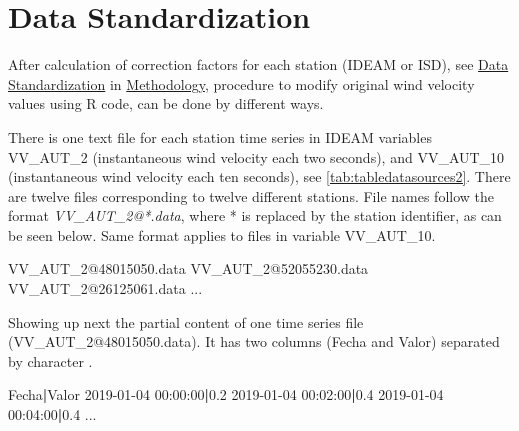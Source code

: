 \documentclass[12pt,oneside]{reedthesis}
\newenvironment{Shaded}{\begin{snugshade}}{\end{snugshade}}
\newcommand{\ExtensionTok}[1]{#1}
\newcommand{\KeywordTok}[1]{\textcolor[rgb]{0.13,0.29,0.53}{\textbf{#1}}}
\newcommand{\NormalTok}[1]{#1}
\begin{document}
\hypertarget{data-standardization-1}{%
\section{Data Standardization}\label{data-standardization-1}}

After calculation of correction factors for each station (IDEAM or ISD), see \protect\hyperlink{rmd-standardization}{Data Standardization} in \protect\hyperlink{rmd-method}{Methodology}, procedure to modify original wind velocity values using R code, can be done by different ways.

There is one text file for each station time series in IDEAM variables VV\_AUT\_2 (instantaneous wind velocity each two seconds), and VV\_AUT\_10 (instantaneous wind velocity each ten seconds), see \ref{tab:tabledatasources2}. There are twelve files corresponding to twelve different stations. File names follow the format \emph{VV\_AUT\_2@*.data}, where * is replaced by the station identifier, as can be seen below. Same format applies to files in variable VV\_AUT\_10.

\scriptsize

\vspace{0.4cm}
\begin{Shaded}
\begin{Highlighting}[]
      \ExtensionTok{VV_AUT_2@48015050.data}
      \ExtensionTok{VV_AUT_2@52055230.data}
      \ExtensionTok{VV_AUT_2@26125061.data}
      \ExtensionTok{...}
\end{Highlighting}
\end{Shaded}
\normalsize

Showing up next the partial content of one time series file (VV\_AUT\_2@48015050.data). It has two columns (Fecha and Valor) separated by character \textbar.

\scriptsize

\vspace{0.4cm}
\begin{Shaded}
\begin{Highlighting}[]
      \ExtensionTok{Fecha}\KeywordTok{|}\ExtensionTok{Valor}
      \ExtensionTok{2019-01-04}\NormalTok{ 00:00:00}\KeywordTok{|}\ExtensionTok{0.2}
      \ExtensionTok{2019-01-04}\NormalTok{ 00:02:00}\KeywordTok{|}\ExtensionTok{0.4}
      \ExtensionTok{2019-01-04}\NormalTok{ 00:04:00}\KeywordTok{|}\ExtensionTok{0.4}
      \ExtensionTok{...}
\end{Highlighting}
\end{Shaded}
\normalsize
\end{document}
